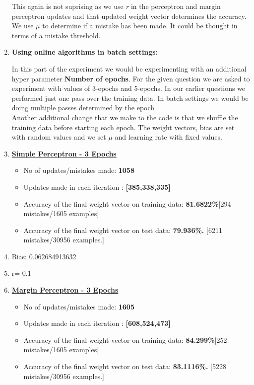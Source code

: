 \documentclass[12pt, fullpage,letterpaper]{article}
\begin{document}
\begin{enumerate}
		This again is not suprising as we use \emph r in  the perceptron and margin perceptron updates and that updated weight vector determines the accuracy. We use $\mu$ to determine if a mistake has been made. It could be thought in terms of a mistake threshold.
		
		
		
		\item \textbf{ Using online algorithms in batch settings:}
		
		In this part of the experiment we would be experimenting with an additional hyper parameter \textbf{ Number of epochs}. For the given question we are asked to experiment with values of 3-epochs and 5-epochs. In our earlier questions we performed just one pass over the training data. In batch settings we would be doing multiple passes determined by the epoch \\
		
		Another additional change that we make to the code is that we shuffle the training data  before starting each epoch. The weight vectors, bias are set with random values and we set $\mu$ and learning rate with fixed values.
		
		\item[] \textbf {\underline{ Simple Perceptron - 3 Epochs }}
		\begin{itemize}
			\item No of updates/mistakes made: \textbf{1058} 
			\item Updates made in each iteration :\textbf{ [385,338,335] } 
			\item Accuracy of the final weight vector on training data: \textbf{81.6822\%}[294 mistakes/1605 examples]
			\item Accuracy of the final weight vector on test data: \textbf{79.936\%. }[6211 mistakes/30956 examples.]
		\end{itemize}
		
		\item[]Bias: 0.062684913632 
		\item[]r= 0.1 \\
			\item[] \textbf {\underline{ Margin Perceptron - 3 Epochs }}
			\begin{itemize}
				\item No of updates/mistakes made: \textbf{1605} 
				\item Updates made in each iteration :\textbf{  [608,524,473]  } 
				\item Accuracy of the final weight vector on training data: \textbf{84.299\%}[252 mistakes/1605 examples]
				\item Accuracy of the final weight vector on test data: \textbf{83.1116\%.}  [5228 mistakes/30956 examples.]
			\end{itemize}
		

\end{enumerate}
\end{document}
